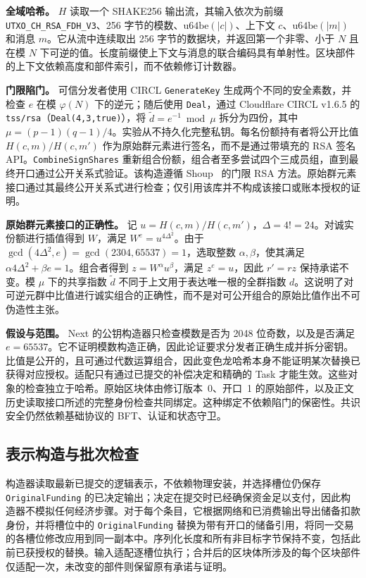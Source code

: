 \noindent\textbf{全域哈希。} $H$ 读取一个 SHAKE256 输出流，其输入依次为前缀 \texttt{UTXO\_CH\_RSA\_FDH\_V3}、256 字节的模数、$\mathrm{u64be}(|c|)$、上下文 $c$、$\mathrm{u64be}(|m|)$ 和消息 $m$。它从流中连续取出 256 字节的数据块，并返回第一个非零、小于 $N$ 且在模 $N$ 下可逆的值。长度前缀使上下文与消息的联合编码具有单射性。区块部件的上下文依赖高度和部件索引，而不依赖修订计数器。

\noindent\textbf{门限陷门。} 可信分发者使用 CIRCL \texttt{GenerateKey} 生成两个不同的安全素数，并检查 $e$ 在模 $\varphi(N)$ 下的逆元；随后使用 \texttt{Deal}，通过 Cloudflare CIRCL v1.6.5 的 \texttt{tss/rsa}（\texttt{Deal(4,3,true)}），将 $\widetilde d=e^{-1}\bmod\mu$ 拆分为四份，其中 $\mu=(p-1)(q-1)/4$。实验从不持久化完整私钥。每名份额持有者将公开比值 $H(c,m)/H(c,m')$ 作为原始群元素进行签名，而不是通过带填充的 RSA 签名 API。\texttt{CombineSignShares} 重新组合份额，组合者至多尝试四个三成员组，直到最终开口通过公开关系式验证。该构造遵循 Shoup~\cite{shoup} 的门限 RSA 方法。原始群元素接口通过其最终公开关系式进行检查；仅引用该库并不构成该接口或账本授权的证明。

\noindent\textbf{原始群元素接口的正确性。} 记 $u=H(c,m)/H(c,m')$，$\Delta=4!=24$。对诚实份额进行插值得到 $W$，满足 $W^e=u^{4\Delta^2}$。由于 $\gcd(4\Delta^2,e)=\gcd(2304,65537)=1$，选取整数 $\alpha,\beta$，使其满足 $\alpha4\Delta^2+\beta e=1$。组合者得到 $z=W^\alpha u^\beta$，满足 $z^e=u$，因此 $r'=rz$ 保持承诺不变。模 $\mu$ 下的共享指数 $\widetilde d$ 不同于上文用于表达唯一根的全群指数 $d$。这说明了对可逆元群中比值进行诚实组合的正确性，而不是对可公开组合的原始比值作出不可伪造性主张。

\noindent\textbf{假设与范围。} Next 的公钥构造器只检查模数是否为 2048 位奇数，以及是否满足 $e=65537$。它不证明模数构造正确，因此论证要求分发者正确生成并拆分密钥。比值是公开的，且可通过代数运算组合，因此变色龙哈希本身不能证明某次替换已获得对应授权。适配只有通过已提交的补偿决定和精确的 Task 才能生效。这些对象的检查独立于哈希。原始区块体由修订版本~0、开口~1 的原始部件，以及正文历史读取接口所述的完整身份检查共同绑定。这种绑定不依赖陷门的保密性。共识安全仍然依赖基础协议的 BFT、认证和状态守卫。

\subsection{表示构造与批次检查}
构造器读取最新已提交的逻辑表示，不依赖物理安装，并选择槽位仍保存 \texttt{OriginalFunding} 的已决定输出；决定在提交时已经确保资金足以支付，因此构造器不模拟任何经济步骤。对于每个条目，它根据网络和已消费输出导出储备扣款身份，并将槽位中的 \texttt{OriginalFunding} 替换为带有开口的储备引用，将同一交易的各槽位修改应用到同一副本中。序列化长度和所有非目标字节保持不变，包括此前已获授权的替换。输入适配逐槽位执行；合并后的区块体所涉及的每个区块部件仅适配一次，未改变的部件则保留原有承诺与证明。

